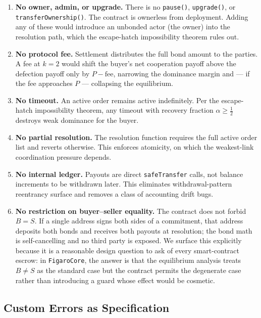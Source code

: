 \documentclass[11pt,a4paper]{article}
\theoremstyle{definition}
\theoremstyle{remark}
\newcommand{\pay}{P}
\begin{document}
\begin{enumerate}
  \item \textbf{No owner, admin, or upgrade.} There is no
    \texttt{pause()}, \texttt{upgrade()}, or \texttt{transferOwnership()}.
    The contract is ownerless from deployment. Adding any of these would
    introduce an unbonded actor (the owner) into the resolution path,
    which the escape-hatch impossibility theorem rules out.
  \item \textbf{No protocol fee.} Settlement distributes the full
    bond amount to the parties. A fee at $k = 2$ would shift the
    buyer's net cooperation payoff above the defection payoff
    only by $\pay - \text{fee}$, narrowing the dominance margin and
    --- if the fee approaches $\pay$ --- collapsing the equilibrium.
  \item \textbf{No timeout.} An active order remains active
    indefinitely. Per the escape-hatch impossibility theorem, any
    timeout with recovery fraction $\alpha \geq \tfrac{1}{2}$ destroys
    weak dominance for the buyer.
  \item \textbf{No partial resolution.} The resolution function
    requires the full active order list and reverts otherwise. This
    enforces atomicity, on which the weakest-link coordination
    pressure depends.
  \item \textbf{No internal ledger.} Payouts are direct
    \texttt{safeTransfer} calls, not balance increments to be
    withdrawn later. This eliminates withdrawal-pattern reentrancy
    surface and removes a class of accounting drift bugs.
  \item \textbf{No restriction on buyer--seller equality.} The
    contract does not forbid $B = S$. If a single address signs both
    sides of a commitment, that address deposits both bonds and
    receives both payouts at resolution; the bond math is
    self-cancelling and no third party is exposed. We surface this
    explicitly because it is a reasonable design question to ask of
    every smart-contract escrow: in \texttt{FigaroCore}, the answer
    is that the equilibrium analysis treats $B \neq S$ as the
    standard case but the contract permits the degenerate case
    rather than introducing a guard whose effect would be cosmetic.
\end{enumerate}

\subsection{Custom Errors as Specification}
\end{document}
